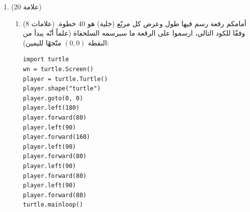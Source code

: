 \documentclass[14pt]{extarticle}
\begin{document}
\begin{enumerate}[resume, label=\textbf{السؤال \arabic*:}, wide=0pt, itemsep=2.2em]
\begin{enumerate}[label=\alph*.]
\begin{boxCode}
\begin{english}
\begin{verbatim}
special_number()
\end{verbatim}
\end{english}
\end{boxCode}

\ifwithsols
\begin{boxSolution}
\begin{enumerate}[label=(\arabic*)]
\item $0$
\item $10$
\item \textenglish{\texttt{num > 0}}
\item \textenglish{\texttt{num \% 10}}
\item $10$
\item \textenglish{\texttt{digit > total / 2}}
\end{enumerate}
\end{boxSolution}
\fi
\filbreak
\end{enumerate}
\filbreak

\item ($20$ علامة)
\begin{enumerate}[label=\alph*.]
\item ($8$ علامات) أمامكم رقعة رسم فيها طول وعرض كل مربّع (خلية) هو $40$ خطوة. وفقًا للكود التالي، ارسموا على الرقعة ما سيرسمه السلحفاة (علماً أنّه يبدأ من النقطة $(0,0)$ متّجهًا لليمين):

\begin{boxCode}
\begin{english}
\begin{verbatim}
import turtle
wn = turtle.Screen()
player = turtle.Turtle()
player.shape("turtle")
player.goto(0, 0)
player.left(180)
player.forward(80)
player.left(90)
player.forward(160)
player.left(90)
player.forward(80)
player.left(90)
player.forward(80)
player.left(90)
player.forward(80)
turtle.mainloop()
\end{verbatim}
\end{english}
\end{boxCode}

\begin{center}
\begin{english}
\end{english}
\end{center}


\end{enumerate}
\end{enumerate}
\end{document}
